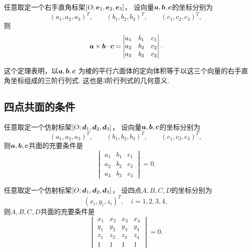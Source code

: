 \begin{theorem}
任意取定一个右手直角标架\([O;\boldsymbol{e}_1,\boldsymbol{e}_2,\boldsymbol{e}_3]\)，
设向量\(\boldsymbol{a},\boldsymbol{b},\boldsymbol{c}\)的坐标分别为\[
	(a_1,a_2,a_3)^T, \qquad
	(b_1,b_2,b_3)^T, \qquad
	(c_1,c_2,c_3)^T,
\]
则\begin{equation}
	\boldsymbol{a}\times\boldsymbol{b}\cdot\boldsymbol{c}
	= \begin{vmatrix}
		a_1 & b_1 & c_1 \\
		a_2 & b_2 & c_2 \\
		a_3 & b_3 & c_3
	\end{vmatrix}.
\end{equation}
\end{theorem}
这个定理表明，以\(\boldsymbol{a},\boldsymbol{b},\boldsymbol{c}\)
为棱的平行六面体的定向体积等于以这三个向量的右手直角坐标组成的三阶行列式.
这也是3阶行列式的几何意义.

\subsection{四点共面的条件}
\begin{theorem}
任意取定一个仿射标架\([O;\boldsymbol{d}_1,\boldsymbol{d}_2,\boldsymbol{d}_3]\)，
设向量\(\boldsymbol{a},\boldsymbol{b},\boldsymbol{c}\)的坐标分别为\[
	(a_1,a_2,a_3)^T, \qquad
	(b_1,b_2,b_3)^T, \qquad
	(c_1,c_2,c_3)^T,
\]
则\(\boldsymbol{a},\boldsymbol{b},\boldsymbol{c}\)共面的充要条件是\[
	\begin{vmatrix}
		a_1 & b_1 & c_1 \\
		a_2 & b_2 & c_2 \\
		a_3 & b_3 & c_3
	\end{vmatrix} = 0.
\]
\end{theorem}

\begin{corollary}
任意取定一个仿射标架\([O;\boldsymbol{d}_1,\boldsymbol{d}_2,\boldsymbol{d}_3]\)，
设四点\(A,B,C,D\)的坐标分别为\[
	(x_i,y_i,z_i)^T,
	\quad i=1,2,3,4,
\]
则\(A,B,C,D\)共面的充要条件是\[
	\begin{vmatrix}
		x_1 & x_2 & x_3 & x_4 \\
		y_1 & y_2 & y_3 & y_4 \\
		z_1 & z_2 & z_3 & z_4 \\
		1 & 1 & 1 & 1
	\end{vmatrix} = 0.
\]
\end{corollary}

